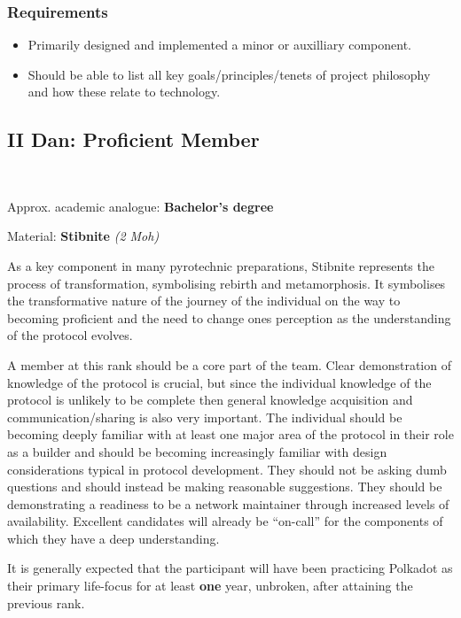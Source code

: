 \documentclass[9pt,oneside]{amsart}
\begin{document}
\subsubsection{Requirements}\label{requirements}

\begin{itemize}
\item Primarily designed and implemented a minor or auxilliary component.
\item Should be able to list all key goals/principles/tenets of project philosophy and how these relate to technology.
\end{itemize}

\subsection{II Dan: Proficient Member}\label{ii-dan-proficient-member}~\\


Approx. academic analogue: \textbf{Bachelor's degree}

Material: \textbf{Stibnite} \emph{(2 Moh)}

As a key component in many pyrotechnic preparations, Stibnite represents the process of transformation, symbolising rebirth and metamorphosis. It symbolises the transformative nature of the journey of the individual on the way to becoming proficient and the need to change ones perception as the understanding of the protocol evolves.

A member at this rank should be a core part of the team. Clear demonstration of knowledge of the protocol is crucial, but since the individual knowledge of the protocol is unlikely to be complete then general knowledge acquisition and communication/sharing is also very important. The individual should be becoming deeply familiar with at least one major area of the protocol in their role as a builder and should be becoming increasingly familiar with design considerations typical in protocol development. They should not be asking dumb questions and should instead be making reasonable suggestions. They should be demonstrating a readiness to be a network maintainer through increased levels of availability. Excellent candidates will already be ``on-call'' for the components of which they have a deep understanding.

It is generally expected that the participant will have been practicing Polkadot as their primary life-focus for at least \textbf{one} year, unbroken, after attaining the previous rank.
\end{document}
